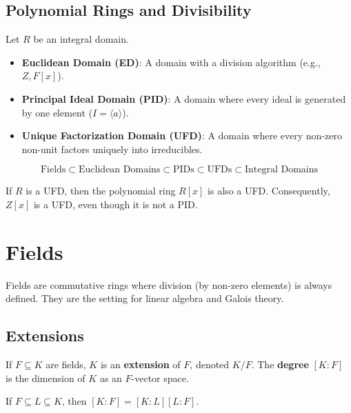 \documentclass[oneside]{book}
\begin{document}
\subsection{Polynomial Rings and Divisibility}

Let $R$ be an integral domain.
\begin{itemize}
    \item \textbf{Euclidean Domain (ED)}: A domain with a division algorithm (e.g., $Z, F[x]$).
    \item \textbf{Principal Ideal Domain (PID)}: A domain where every ideal is generated by one element ($I = \langle a \rangle$).
    \item \textbf{Unique Factorization Domain (UFD)}: A domain where every non-zero non-unit factors uniquely into irreducibles.
\end{itemize}

\begin{theorem}
\[ \text{Fields} \subset \text{Euclidean Domains} \subset \text{PIDs} \subset \text{UFDs} \subset \text{Integral Domains} \]
\end{theorem}

\begin{theorem}
If $R$ is a UFD, then the polynomial ring $R[x]$ is also a UFD. Consequently, $Z[x]$ is a UFD, even though it is not a PID.
\end{theorem}

\section{Fields}

Fields are commutative rings where division (by non-zero elements) is always defined. They are the setting for linear algebra and Galois theory.

\subsection{Extensions}

\begin{definition}
If $F \subseteq K$ are fields, $K$ is an \textbf{extension} of $F$, denoted $K/F$. The \textbf{degree} $[K:F]$ is the dimension of $K$ as an $F$-vector space.
\end{definition}

\begin{theorem}
If $F \subseteq L \subseteq K$, then $[K:F] = [K:L][L:F]$.
\end{theorem}
\end{document}
